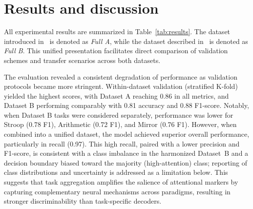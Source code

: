 \documentclass[10pt,letterpaper]{article}
\newcommand{\rev}[1]{\par\noindent\colorbox{yellow}{\parbox{\dimexpr\linewidth-2\fboxsep\relax}{#1}}\par}
\renewcommand{\rev}[1]{#1}
\begin{document}
\section*{Results and discussion}

All experimental results are summarized in Table~\ref{tab:results}. The dataset introduced in~\cite{aci2019attention} is denoted as \textit{Full A}, while the dataset described in~\cite{ghosh2022sam40} is denoted as \textit{Full B}. This unified presentation facilitates direct comparison of validation schemes and transfer scenarios across both datasets.

The evaluation revealed a consistent degradation of performance as validation protocols became more stringent. Within-dataset validation (stratified K-fold) yielded the highest scores, with Dataset A reaching 0.86 in all metrics, and Dataset B performing comparably with 0.81 accuracy and 0.88 F1-score. Notably, when Dataset B tasks were considered separately, performance was lower for Stroop (0.78 F1), Arithmetic (0.72 F1), and Mirror (0.76 F1). However, when combined into a unified dataset, the model achieved superior overall performance, particularly in recall (0.97). \rev{This high recall, paired with a lower precision and F1-score, is consistent with a class imbalance in the harmonized Dataset~B and a decision boundary biased toward the majority (high-attention) class; reporting of class distributions and uncertainty is addressed as a limitation below.} This suggests that task aggregation amplifies the salience of attentional markers by capturing complementary neural mechanisms across paradigms, resulting in stronger discriminability than task-specific decoders.
\end{document}
